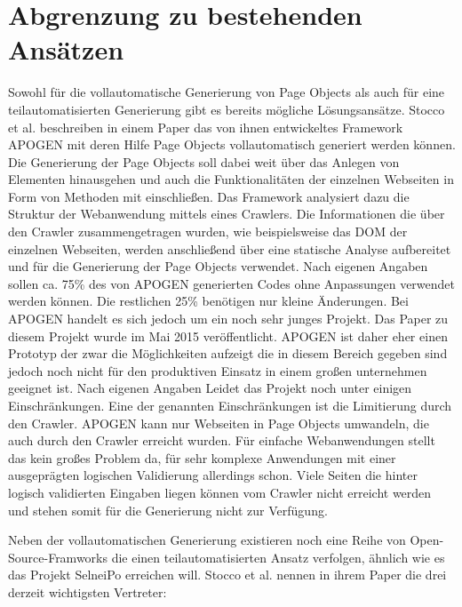 \section{Abgrenzung zu bestehenden Ansätzen}
Sowohl für die vollautomatische Generierung von Page Objects als auch für eine teilautomatisierten Generierung gibt es bereits mögliche Lösungsansätze. 
Stocco et al. \cite{stocco_why_2015} beschreiben in einem Paper das von ihnen entwickeltes Framework APOGEN mit deren Hilfe Page Objects vollautomatisch generiert werden können. Die Generierung der Page Objects soll dabei weit über das Anlegen von Elementen hinausgehen und auch die Funktionalitäten der einzelnen Webseiten in Form von Methoden mit einschließen.
Das Framework analysiert dazu die Struktur der Webanwendung mittels eines Crawlers. Die Informationen die über den Crawler zusammengetragen wurden, wie beispielsweise das DOM der einzelnen Webseiten, werden anschließend über eine statische Analyse aufbereitet und für die Generierung der Page Objects verwendet.
Nach eigenen Angaben sollen ca. 75\% des von APOGEN generierten Codes ohne Anpassungen verwendet werden können. Die restlichen 25\% benötigen nur kleine Änderungen.
Bei APOGEN handelt es sich jedoch um ein noch sehr junges Projekt. Das Paper zu diesem Projekt wurde im Mai 2015 veröffentlicht. APOGEN ist daher eher einen Prototyp der zwar die Möglichkeiten aufzeigt die in diesem Bereich gegeben sind jedoch noch nicht für den produktiven Einsatz in einem großen unternehmen geeignet ist.
Nach eigenen Angaben Leidet das Projekt noch unter einigen Einschränkungen. Eine der genannten Einschränkungen ist die Limitierung durch den Crawler.
APOGEN kann nur Webseiten in Page Objects umwandeln, die auch durch den Crawler erreicht wurden.
Für einfache Webanwendungen stellt das kein großes Problem da, für sehr komplexe Anwendungen mit einer ausgeprägten logischen Validierung allerdings schon.
Viele Seiten die hinter logisch validierten Eingaben liegen können vom Crawler nicht erreicht werden und stehen somit für die Generierung nicht zur Verfügung.

Neben der vollautomatischen Generierung existieren noch eine Reihe von Open-Source-Framworks 
die einen teilautomatisierten Ansatz verfolgen, ähnlich wie es das Projekt SelneiPo erreichen will.
Stocco et al. \cite{stocco_why_2015} nennen in ihrem Paper die drei derzeit wichtigsten Vertreter:


